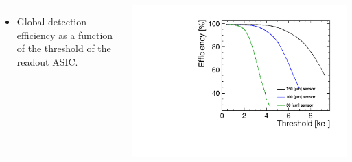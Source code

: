 \begin{frame}
\begin{columns}
    \begin{itemize}
    \item Global detection efficiency as a function of the threshold
      of the readout ASIC.
    \end{itemize}
    \centering
    \includegraphics[width=\textwidth]{../figures/TestBeam/Efficiency_vs_THL.pdf}
  \end{columns}


\end{frame}

